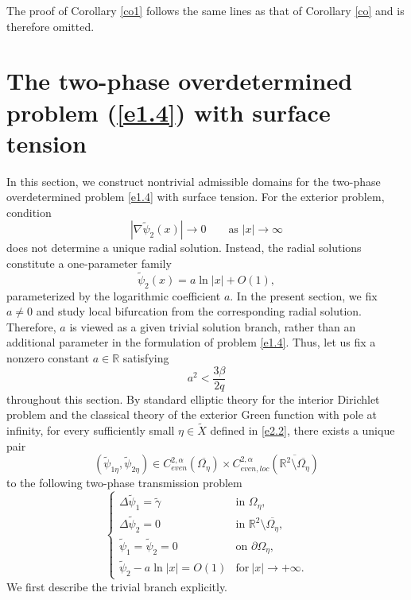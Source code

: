 \documentclass[reqno]{amsart}
\numberwithin{equation}{section}
\numberwithin{equation}{section}
\numberwithin{equation}{section}
\begin{document}
The proof of Corollary \ref{co1} follows the same lines as that of Corollary \ref{co} and is therefore omitted.




\medskip

\section{The two-phase overdetermined problem (\ref{e1.4}) with surface tension}

In this section, we construct nontrivial admissible domains for the two-phase overdetermined problem \eqref{e1.4} with surface tension.
For the exterior problem, condition
\[
|\nabla\widetilde{\psi}_{2}(x)|\to0
\qquad\text{as }|x|\to\infty
\]
does not determine a unique radial solution. Instead, the radial solutions constitute a one-parameter family
\[
\widetilde{\psi}_{2}(x)=a\ln|x|+O(1),
\]
parameterized by the logarithmic coefficient $a$. In the present section, we fix $a\neq0$ and study local bifurcation from the corresponding radial solution. Therefore, $a$ is viewed as a given trivial solution branch, rather than an additional parameter in the formulation of problem \eqref{e1.4}.
Thus, let us fix a nonzero constant $a\in\mathbb{R}$ satisfying
\begin{equation}\label{ezy}
a^2<\frac{3\beta}{2q}
\end{equation}
throughout this section. By standard elliptic theory for the interior Dirichlet problem and the classical theory of the exterior Green function with pole at infinity, for every sufficiently small $\eta\in \widetilde{X}$ defined in \eqref{e2.2}, there exists a unique pair
$$(\widetilde{\psi}_{1\eta},\widetilde{\psi}_{2\eta})\in C_{even}^{2,\alpha}(\overline{\Omega_{\eta}})\times C_{even,loc}^{2,\alpha}(\overline{\mathbb{R}^2\setminus\overline{\Omega_{\eta}}})$$
to the following two-phase transmission problem
\begin{equation}\label{e5.1}
\begin{cases}
\Delta \widetilde{\psi}_1 = \widetilde{\gamma} & \text{in } \Omega_{\eta}, \\
\Delta \widetilde{\psi}_2 = 0 & \text{in } \mathbb{R}^2 \setminus \overline{\Omega_{\eta}}, \\
\widetilde{\psi}_1 = \widetilde{\psi}_2=0 & \text{on } \partial \Omega_{\eta}, \\
 \widetilde{\psi}_2-a\ln|x|=O(1) & \text{for}~ |x|\rightarrow+\infty.
\end{cases}
\end{equation}
We first describe the trivial branch explicitly.
\end{document}

